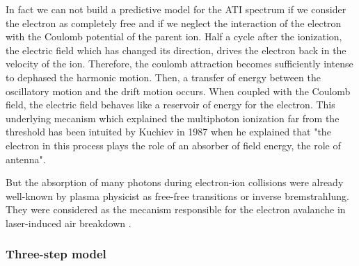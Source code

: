 \documentclass[a4paper]{article}
\begin{document}
\par
In fact we can not build a predictive model for the ATI spectrum if we consider the electron as completely free and if we neglect the interaction of the electron with the Coulomb potential of the parent ion. Half a cycle after the ionization, the electric field which has changed its direction, drives the electron back in the velocity of the ion. Therefore, the coulomb attraction becomes sufficiently intense to dephased the harmonic motion. Then, a transfer of energy between the oscillatory motion and the drift motion occurs. When coupled with the Coulomb field, the electric field behaves like a reservoir of energy for the electron. This underlying mecanism which explained the multiphoton ionization far from the threshold has been intuited by Kuchiev in 1987 \cite{Kuchiev_1987} when he explained that "the electron in this process plays the role of an absorber of field energy, the role of antenna". 
\par
But the absorption of many photons during electron-ion collisions were already well-known by plasma physicist as free-free transitions or inverse bremstrahlung. They were considered as the mecanism responsible for the electron avalanche in laser-induced air breakdown \cite{Chin_2004}.

\subsubsection{Three-step model}
\end{document}
